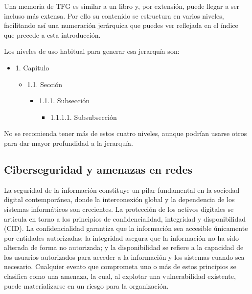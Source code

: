Una memoria de TFG es similar a un libro y, por extensión, puede llegar a ser incluso más extensa. Por ello su contenido se estructura en varios niveles, facilitando así una numeración jerárquica que puedes ver reflejada en el índice que precede a esta introducción. 

Los niveles de uso habitual para generar esa jerarquía son:

\begin{itemize}
    \item 1. Capítulo
    \begin{itemize}
        \item 1.1. Sección
        \begin{itemize}
            \item 1.1.1. Subsección
            \begin{itemize}
                \item 1.1.1.1. Subsubsección
            \end{itemize}
        \end{itemize}
    \end{itemize}
\end{itemize}

No se recomienda tener más de estos cuatro niveles, aunque podrían usarse otros para dar mayor profundidad a la jerarquía.

\subsection{Ciberseguridad y amenazas en redes}

La seguridad de la información constituye un pilar fundamental en la sociedad digital contemporánea, donde la interconexión global y la dependencia de los sistemas informáticos son crecientes. La protección de los activos digitales se articula en torno a los principios de confidencialidad, integridad y disponibilidad (CID). La confidencialidad garantiza que la información sea accesible únicamente por entidades autorizadas; la integridad asegura que la información no ha sido alterada de forma no autorizada; y la disponibilidad se refiere a la capacidad de los usuarios autorizados para acceder a la información y los sistemas cuando sea necesario. Cualquier evento que comprometa uno o más de estos principios se clasifica como una amenaza, la cual, al explotar una vulnerabilidad existente, puede materializarse en un riesgo para la organización.

